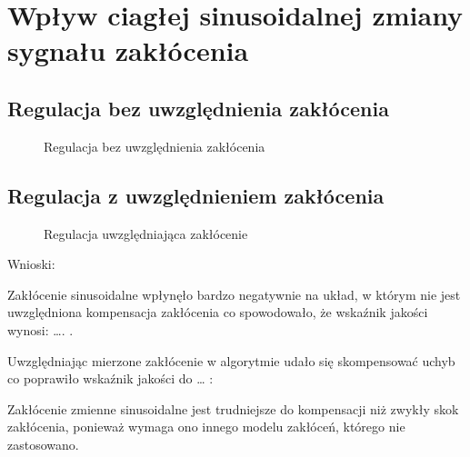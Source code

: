 \section{Wpływ ciagłej sinusoidalnej zmiany sygnału zakłócenia}
\label{projekt:zad6}

\subsection{Regulacja bez uwzględnienia zakłócenia}
\label{projekt:zad6:regulacjaBezUwzg}

\begin{figure}[H] 
    \centering
    
    \caption{Regulacja bez uwzględnienia zakłócenia}
    \label{projekt:zad6:regulacjaBezUwzg:figure}
\end{figure}

\subsection{Regulacja z uwzględnieniem zakłócenia}
\label{projekt:zad6:regulacjaZUwzg}

\begin{figure}[H] 
    \centering
    
    \caption{Regulacja uwzględniająca zakłócenie}
    \label{projekt:zad6:regulacjaZUwzg:figure}
\end{figure}

Wnioski: 

Zakłócenie sinusoidalne wpłynęło bardzo negatywnie na układ, 
w którym nie jest uwzględniona kompensacja zakłócenia co spowodowało, 
że wskaźnik jakości wynosi: …. . 

Uwzględniając mierzone zakłócenie w algorytmie udało się skompensować uchyb co poprawiło wskaźnik jakości do … :

Zakłócenie zmienne sinusoidalne jest trudniejsze do kompensacji niż zwykły skok zakłócenia, 
ponieważ wymaga ono innego modelu zakłóceń, którego nie zastosowano.
